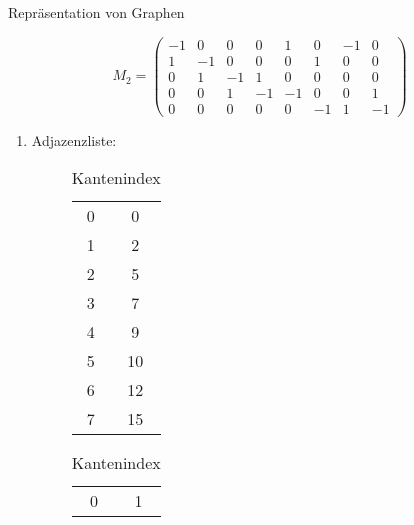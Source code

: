 \documentclass[11pt,a4paper]{article}
\begin{document}
\begin{aufgabe}{1}{Repräsentation von Graphen}
\begin{enumerate}
\begin{equation*}
            M_2 = \begin{pmatrix}
                -1 & 0 & 0 & 0 & 1 & 0 & -1 & 0 \\
                1 & -1 & 0 & 0 & 0 & 1 & 0 & 0 \\
                0 & 1 & -1 & 1 & 0 & 0 & 0 & 0 \\
                0 & 0 & 1 & -1 & -1 & 0 & 0 & 1 \\
                0 & 0 & 0 & 0 & 0 & -1 & 1 & -1
            \end{pmatrix}
        \end{equation*}
    \end{enumerate}
\end{aufgabe}
\begin{loesung}
    \begin{enumerate}
        \item 
        \begin{description}
            \item[Adjazenzliste:] 
            \begin{table}[!htb]
                \centering
                \parbox{0.45\linewidth}{
                    \centering
                    \begin{tabular}[t]{c|c|}
                        \cline{2-2}
                        0 & 0 \\
                        \cline{2-2}
                        1 & 2 \\
                        \cline{2-2}
                        2 & 5 \\
                        \cline{2-2}
                        3 & 7 \\
                        \cline{2-2}
                        4 & 9 \\
                        \cline{2-2}
                        5 & 10 \\
                        \cline{2-2}
                        6 & 12 \\
                        \cline{2-2}
                        7 & 15 \\
                        \cline{2-2}
                    \end{tabular}
                    \caption*{Kantenindex}
                }
                \parbox{0.45\linewidth}{
                    \centering
                    \begin{tabular}[t]{c|c|}
                        \cline{2-2}
                        0 & 1 \\

\end{tabular}}
\end{table}
\end{description}
\end{enumerate}
\end{loesung}
\end{document}
